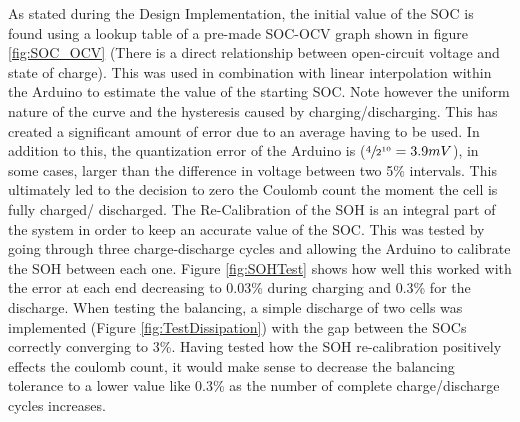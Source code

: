 \documentclass[10pt,twoside]{article}
\begin{document}
As stated during the Design Implementation, the initial value of the SOC is found using a lookup table of a pre-made SOC-OCV graph shown in figure \ref{fig:SOC_OCV} (There is a direct relationship between open-circuit voltage and state of charge). This was used in combination with linear interpolation within the Arduino to estimate the value of the starting SOC. Note however the uniform nature of the curve and the hysteresis caused by charging/discharging. This has created a significant amount of error due to an average having to be used. In addition to this, the quantization error of the Arduino is ($\sfrac{4}{2^{10}} = 3.9mV$), in some cases, larger than the difference in voltage between two 5\% intervals. This ultimately led to the decision to zero the Coulomb count the moment the cell is fully charged/ discharged. The Re-Calibration of the SOH is an integral part of the system in order to keep an accurate value of the SOC. This was tested by going through three charge-discharge cycles and allowing the Arduino to calibrate the SOH between each one. Figure \ref{fig:SOHTest} shows how well this worked with the error at each end decreasing to 0.03\% during charging and 0.3\% for the discharge. When testing the balancing, a simple discharge of two cells was implemented (Figure \ref{fig:TestDissipation}) with the gap between the SOCs correctly converging to 3\%. Having tested how the SOH re-calibration positively effects the coulomb count, it would make sense to decrease the balancing tolerance to a lower value like 0.3\% as the number of complete charge/discharge cycles increases.
\end{document}

